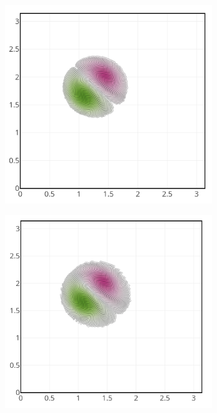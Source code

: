 \begin{figure}[htbp]
	\centering
	\begin{subfigure}{0.3\textwidth}
		\includegraphics[width=\linewidth]{images/app2d/part_eps_0.1.png}
	\end{subfigure}
	\hfill
	\begin{subfigure}{0.3\textwidth}
		\includegraphics[width=\linewidth]{images/app2d/part_eps_0.01.png}

\end{subfigure}
\end{figure}

